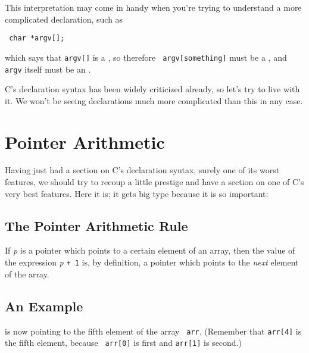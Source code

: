 This interpretation may come in handy when you're trying to understand a
more complicated declaration, such as

\begin{flushleft}
\verb! char *argv[]; !
\end{flushleft}

\noindent which says that {\tt *argv[]} is a \chr, so therefore {\tt
argv[{\rm something}]} must be a \Char, and {\tt argv} itself must be
an \ao{\ptr\Char}. 

C's declaration syntax has been widely criticized already, so let's try
to live with it.  We won't be seeing declarations much more complicated
than this in any case.

\section{Pointer Arithmetic}

Having just had a section on C's declaration syntax, surely one of its
worst features, we should try to recoup a little prestige and have a
section on one of C's very best features.  Here it is; it gets big type
because it is so important:

\subsection{The Pointer Arithmetic Rule}

{\large If {\em p}\/ is a pointer which points to a certain element of
an array, then the value of the expression {\em p} {\tt + 1} is, by
definition, a pointer which points to the {\em next}\/ element of the
array.}

\subsection{An Example}

\begin{flushleft}
\verb% float arr[53], *p *q;% \\*
\verb% % \\*
\verb% p = &arr[4];% 
\end{flushleft}

 is now pointing to the fifth element of the array {\tt
arr}.  (Remember that {\tt arr[4]} is the fifth element, because {\tt
arr[0]} is first and {\tt arr[1]} is second.)

\begin{flushleft}
\verb% q = p + 1; % 
\end{flushleft}

